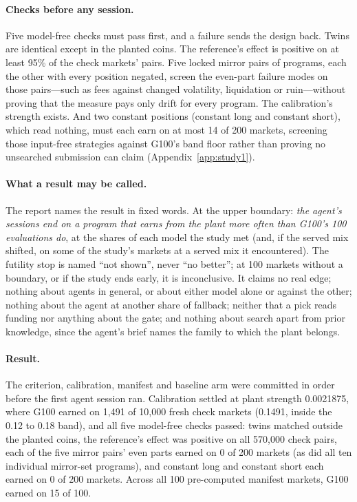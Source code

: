 \documentclass[11pt]{article}
\begin{document}
\paragraph{Checks before any session.} Five model-free checks must pass first, and a failure sends the design back. Twins are identical except in the planted coins. The reference's effect is positive on at least 95\% of the check markets' pairs. Five locked mirror pairs of programs, each the other with every position negated, screen the even-part failure modes on those pairs---such as fees against changed volatility, liquidation or ruin---without proving that the measure pays only drift for every program. The calibration's strength exists. And two constant positions (constant long and constant short), which read nothing, must each earn on at most 14 of 200 markets, screening those input-free strategies against G100's band floor rather than proving no unsearched submission can claim (Appendix~\ref{app:study1}).

\paragraph{What a result may be called.} The report names the result in fixed words. At the upper boundary: \emph{the agent's sessions end on a program that earns from the plant more often than G100's 100 evaluations do}, at the shares of each model the study met (and, if the served mix shifted, on some of the study's markets at a served mix it encountered). The futility stop is named ``not shown'', never ``no better''; at 100 markets without a boundary, or if the study ends early, it is inconclusive. It claims no real edge; nothing about agents in general, or about either model alone or against the other; nothing about the agent at another share of fallback; neither that a pick reads funding nor anything about the gate; and nothing about search apart from prior knowledge, since the agent's brief names the family to which the plant belongs.

\paragraph{Result.} The criterion, calibration, manifest and baseline arm were committed in order before the first agent session ran. Calibration settled at plant strength 0.0021875, where G100 earned on 1{,}491 of 10{,}000 fresh check markets (0.1491, inside the 0.12 to 0.18 band), and all five model-free checks passed: twins matched outside the planted coins, the reference's effect was positive on all 570{,}000 check pairs, each of the five mirror pairs' even parts earned on 0 of 200 markets (as did all ten individual mirror-set programs), and constant long and constant short each earned on 0 of 200 markets. Across all 100 pre-computed manifest markets, G100 earned on 15 of 100.
\end{document}
